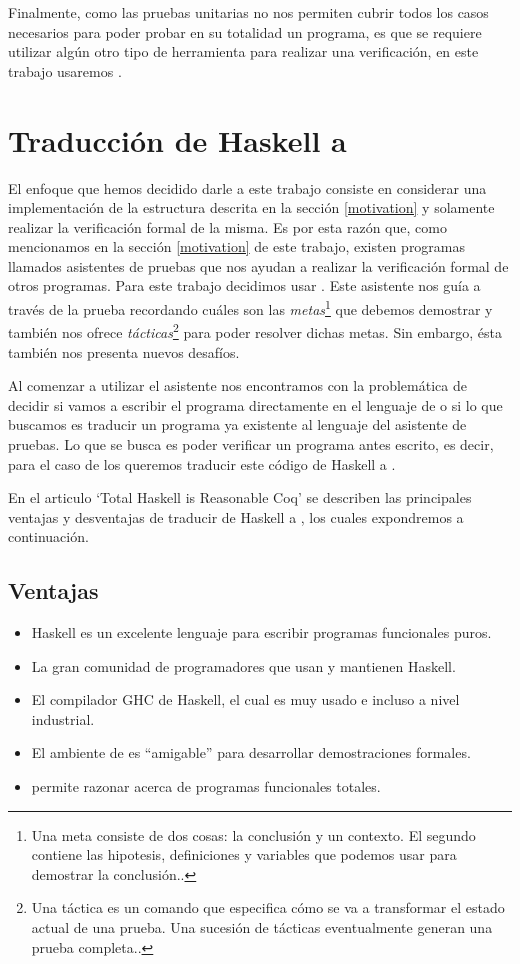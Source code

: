 Finalmente, como las pruebas unitarias no nos permiten cubrir todos los casos necesarios para poder probar en su totalidad un programa, es que se requiere utilizar algún otro tipo de herramienta para realizar una verificaci\'on, en este trabajo usaremos {\coq}.



\section{Traducción de Haskell a {\coq}}
El enfoque que hemos decidido darle a este trabajo consiste en considerar una implementaci\'on de 
la estructura descrita en la secci\'on \ref{motivation} y solamente realizar la verificaci\'on formal de la 
misma. Es por esta raz\'on que, como mencionamos en la secci\'on \ref{motivation} de este trabajo, 
existen programas llamados asistentes de pruebas que nos ayudan a realizar la verificaci\'on formal 
de otros programas. Para este trabajo decidimos usar {\coq}. Este asistente nos gu\'ia a través de 
la prueba recordando cu\'ales son las \textit{metas}\footnote{Una meta consiste de dos cosas: la 
conclusi\'on y un contexto. El segundo contiene las hipotesis, definiciones y variables que podemos 
usar para demostrar la conclusi\'on.\cite{GOALS}.} que debemos demostrar y tambi\'en nos ofrece 
\textit{t\'acticas}\footnote{Una táctica es un comando que especifica c\'omo se va a transformar el 
estado actual de una prueba. Una sucesión de tácticas eventualmente generan una prueba 
completa.\cite{TACTICS}.} para poder resolver dichas metas. Sin embargo, \'esta tambi\'en nos presenta 
nuevos desaf\'ios.

Al comenzar a utilizar el asistente nos encontramos con la problem\'atica de decidir si vamos a 
escribir el programa directamente en el lenguaje de {\coq} o si lo que buscamos es traducir un 
programa ya existente al lenguaje del asistente de pruebas. Lo que se busca es poder verificar un 
programa antes escrito, es decir, para el caso de los {\arns} queremos traducir este código de 
Haskell a {\coq}.

En el articulo `Total Haskell is Reasonable Coq' \cite{thrc} se describen las principales ventajas
y desventajas de traducir de Haskell a {\coq}, los cuales expondremos a continuaci\'on.

\subsection{Ventajas}
\begin{itemize}
    \item Haskell es un excelente lenguaje para escribir programas funcionales puros.
    \item La gran comunidad de programadores que usan y mantienen Haskell.
    \item El compilador GHC de Haskell, el cual es muy usado e incluso a nivel industrial.
    \item El ambiente de {\coq} es ``amigable'' para desarrollar demostraciones formales.
    \item {\coq} permite razonar acerca de programas funcionales totales.
\end{itemize}

